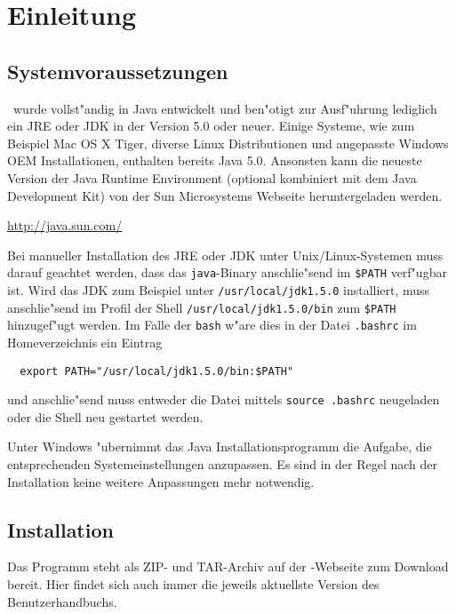 
\chapter{Einleitung}



\section{Systemvoraussetzungen}

\TPML\ wurde vollst"andig in Java entwickelt und ben"otigt zur Ausf"uhrung lediglich ein JRE oder
JDK in der Version 5.0 oder neuer.
Einige Systeme, wie zum Beispiel Mac OS X Tiger, diverse Linux Distributionen und angepasste Windows
OEM Installationen, enthalten bereits Java 5.0. Ansonsten kann die neueste Version der Java Runtime
Environment (optional kombiniert mit dem Java Development Kit) von der Sun Microsystems Webseite
heruntergeladen werden.

\url{http://java.sun.com/}

Bei manueller Installation des JRE oder JDK unter Unix/Linux-Systemen muss darauf geachtet werden, dass
das {\tt java}-Binary anschlie"send im {\tt \$PATH} verf"ugbar ist. Wird das JDK zum Beispiel unter
{\tt /usr/local/jdk1.5.0} installiert, muss anschlie"send im Profil der Shell {\tt /usr/local/jdk1.5.0/bin}
zum {\tt \$PATH} hinzugef"ugt werden. Im Falle der {\tt bash} w"are dies in der Datei {\tt .bashrc}
im Homeverzeichnis ein Eintrag
\begin{verbatim}
  export PATH="/usr/local/jdk1.5.0/bin:$PATH"
\end{verbatim}
und anschlie"send muss entweder die Datei mittels {\tt source .bashrc} neugeladen oder die
Shell neu gestartet werden.

Unter Windows "ubernimmt das Java Installationsprogramm die Aufgabe, die entsprechenden Systemeinstellungen
anzupassen. Es sind in der Regel nach der Installation keine weitere Anpassungen mehr notwendig.



\section{Installation}

Das Programm steht als ZIP- und TAR-Archiv auf der \TPML-Webseite zum Download bereit. Hier findet sich
auch immer die jeweils aktuellste Version des Benutzerhandbuchs.

